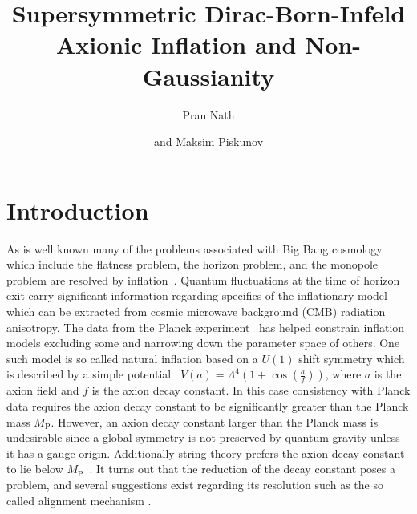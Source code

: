 \documentclass[a4paper,11pt]{article}
\title{\boldmath Supersymmetric Dirac-Born-Infeld Axionic Inflation and Non-Gaussianity}
\author{Pran Nath}
\author{and Maksim Piskunov}
\affiliation{Department of Physics, Northeastern University,\\Boston, MA 02115-5000, USA}
\begin{document}
 
\maketitle
\flushbottom
\fbox{{\today}}

\section{Introduction}
  As is well known many of the problems associated with Big Bang cosmology which include
  the flatness problem, the horizon problem, and the monopole problem are resolved by inflation~\cite{Guth:1980zm,Starobinsky:1980te,Linde:1981mu,Albrecht:1982wi,Sato,Linde:1983gd}.
  Quantum fluctuations at the time of horizon exit carry significant information regarding specifics
  of the inflationary model~\cite{Mukhanov+,Cheung:2007st}
  which can be extracted from cosmic microwave background (CMB) radiation anisotropy.
  The data from the Planck experiment~\cite{Adam:2015rua,Ade:2015lrj,Array:2015xqh} has helped
  constrain inflation models excluding some and narrowing down the parameter space of others.
  One such model is so called natural inflation based on a $U(1)$ shift symmetry
  which is described by a simple potential~\cite{Freese:1990rb,Adams:1992bn}
  $V(a) = \Lambda^4 \left(1+ \cos(\frac{a}{f})\right)$,
  where $a$ is the axion field and $f$ is the axion decay constant.
  In this case consistency with Planck data requires the axion decay constant to be significantly greater than the Planck mass $M_\text{P}$.
  However, an axion decay constant larger than the Planck mass is undesirable since a global symmetry is not preserved by quantum gravity
  unless it has a gauge origin. Additionally string theory prefers the axion decay constant to lie below $M_\text{P}$~\cite{Banks:2003sx,Svrcek:2006yi}.
  It turns out that the reduction of the decay constant poses a problem, and several suggestions exist regarding its resolution such as the
  so called alignment mechanism \cite{Kim:2004rp,Long:2014dta}.
\end{document}
